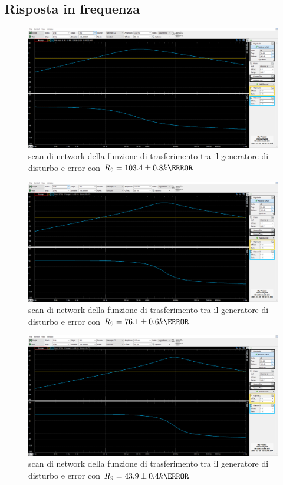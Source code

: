 \documentclass[10pt, a4paper, italian]{article}
\begin{document}
\subsection{Risposta in frequenza}
\begin{figure}[H]
    \centering
	\includegraphics[scale=0.4]{103.4k}
    \caption{scan di network della funzione di trasferimento tra il generatore di disturbo e error con $R_9= 103.4 \pm 0.8 k\ohm$
    \label{fig: Draft1}}
\end{figure}
\begin{figure}[H]
    \centering
	\includegraphics[scale=0.4]{76.1k}
    \caption{scan di network della funzione di trasferimento tra il generatore di disturbo e error con $R_9=76.1 \pm 0.6 k\ohm$
    \label{fig: Draft1}}
\end{figure}
\begin{figure}[H]
    \centering
	\includegraphics[scale=0.4]{43.9k}
    \caption{scan di network della funzione di trasferimento tra il generatore di disturbo e error con $R_9= 43.9 \pm 0.4 k\ohm$
    \label{fig: Draft1}}
\end{figure}
\end{document}
